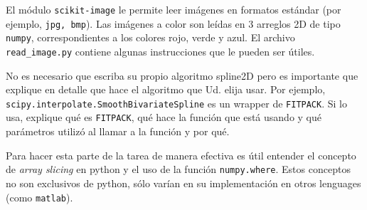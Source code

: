 \documentclass[letter, 11pt]{article}
\begin{document}
\begin{ayuda}
  \small

  El módulo \texttt{scikit-image} le permite leer imágenes en formatos estándar
  (por ejemplo, \texttt{jpg, bmp}). Las imágenes a color son leídas en 3
  arreglos 2D de tipo \texttt{numpy}, correspondientes a los colores rojo,
  verde y azul. El archivo \texttt{read\_image.py} contiene algunas
  instrucciones que le pueden ser útiles.

  No es necesario que escriba su propio algoritmo spline2D pero es importante
  que explique en detalle que hace el algoritmo que Ud. elija usar. Por
  ejemplo, \texttt{scipy.interpolate.SmoothBivariateSpline} es un wrapper de
  \texttt{FITPACK}. Si lo usa, explique qué es \texttt{FITPACK}, qué hace la
  función que está usando y qué parámetros utilizó al llamar a la función y por
  qué.

  Para hacer esta parte de la tarea de manera efectiva es útil entender el
  concepto de \emph{array slicing} en python y el uso de la función
  \texttt{numpy.where}. Estos conceptos no son exclusivos de python, sólo
  varían en su implementación en otros lenguages (como \texttt{matlab}).
\end{ayuda}
\end{document}
